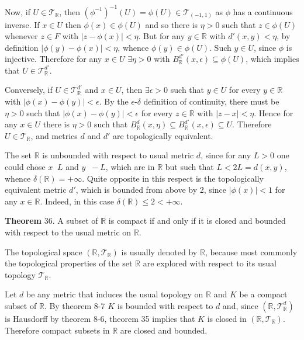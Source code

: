 \documentclass[a4paper]{article}
\newcommand{\brac}[1]{\left ( #1 \right )}
\newcommand{\abs}[1]{\left | #1 \right |}
\newcommand{\Real}{\mathbb{R}}
\newcommand{\Tcal}{\mathcal{T}}
\newcommand{\defn}{\mathop{\overset{\Delta}{=}}\nolimits}
\begin{document}
Now, if $U\in \Tcal_\Real$, then $\brac{\phi^{-1}}^{-1}\brac{U}=\phi\brac{U}\in \Tcal_{\brac{-1,1}}$ as $\phi$ has a continuous inverse. If $x\in U$ then $\phi\brac{x}\in \phi\brac{U}$ and so there is $\eta>0$ such that $z\in \phi\brac{U}$ whenever $z\in F$ with $\abs{z-\phi\brac{x}}<\eta$. But for any $y\in\Real$ with $d'\brac{x,y}<\eta$, by definition $\abs{\phi\brac{y}-\phi\brac{x}}<\eta$, whence $\phi\brac{y}\in \phi\brac{U}$. Such $y\in U$, since $\phi$ is injective. Therefore for any $x\in U$ $\exists \eta>0$ with $B^{d'}_\Real\brac{x, \epsilon}\subseteq \phi\brac{U}$, which implies that $U\in\Tcal_\Real^{d'}$.

Conversely, if $U\in\Tcal_\Real^{d'}$ and $x\in U$, then $\exists \epsilon>0$ such that $y\in U$ for every $y\in \Real$ with $\abs{\phi\brac{x}-\phi\brac{y}}<\epsilon$. By the $\epsilon$-$\delta$ definition of continuity, there must be $\eta>0$ such that $\abs{\phi\brac{x}-\phi\brac{y}}<\epsilon$ for every $z\in \Real$ with $\abs{z-x}<\eta$. Hence for any $x\in U$ there is $\eta>0$ such that $B_\Real^d\brac{x,\eta}\subseteq B_\Real^{d'}\brac{x,\epsilon}\subseteq U$. Therefore $U\in \Tcal_\Real$, and metrics $d$ and $d'$ are topologically equivalent.

The set $\Real$ is unbounded with respect to usual metric $d$, since for any $L>0$ one could chose $x\defn L$ and $y\defn -L$, which are in $\Real$ but such that $L < 2 L = d\brac{x,y}$, whence $\delta\brac{\Real}=+\infty$. Quite opposite in this respect is the topologically equivalent metric $d'$, which is bounded from above by 2, since $\abs{\phi\brac{ x }} < 1$  for any $x\in \Real$. Indeed, in this case $\delta\brac{\Real}\leq 2<+\infty$.

\label{thm:compact_clo_bound} \noindent \textbf{Theorem} 36.
A subset of $\Real$ is compact if and only if it is closed and bounded with respect to the usual metric on $\Real$. 

The topological space $\brac{\Real, \Tcal_\Real}$ is usually denoted by $\Real$, because most commonly the topological properties of the set $\Real$ are explored with respect to its usual topology $\Tcal_\Real$.

Let $d$ be any metric that induces the usual topology on $\Real$ and $K$ be a compact subset of $\Real$. By theorem 8-7 $K$ is bounded with respect to $d$ and, since $\brac{\Real, \Tcal_\Real^d}$ is Hausdorff by theorem 8-6, theorem 35 implies that $K$ is closed in $\brac{\Real, \Tcal_\Real}$. Therefore compact subsets in $\Real$ are closed and bounded.
\end{document}
